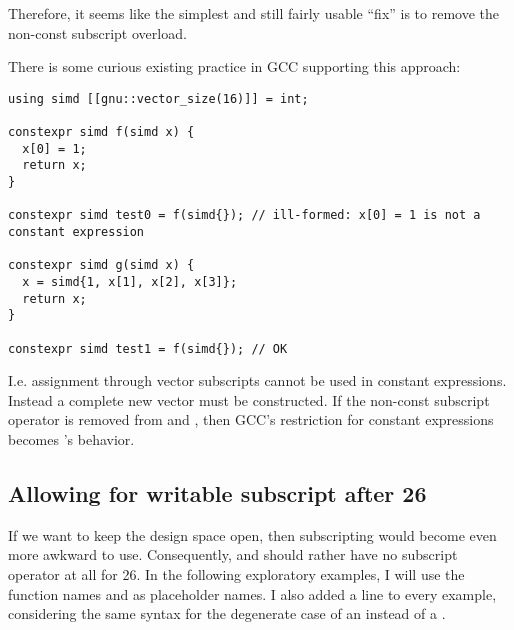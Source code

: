 Therefore, it seems like the simplest and still fairly usable “fix” is to
remove the non-const subscript overload.

There is some curious existing practice in GCC supporting this approach:
\medskip\begin{lstlisting}[style=Vc]
using simd [[gnu::vector_size(16)]] = int;

constexpr simd f(simd x) {
  x[0] = 1;
  return x;
}

constexpr simd test0 = f(simd{}); // ill-formed: x[0] = 1 is not a constant expression

constexpr simd g(simd x) {
  x = simd{1, x[1], x[2], x[3]};
  return x;
}

constexpr simd test1 = f(simd{}); // OK
\end{lstlisting}
I.e. assignment through vector subscripts cannot be used in constant expressions.
Instead a complete new vector must be constructed.
If the non-const subscript operator is removed from \simd and \mask, then GCC's
restriction for constant expressions becomes \std\simd's behavior.

\subsection{Allowing for writable subscript after \CC{}26}

If we want to keep the design space open, then subscripting would become even
more awkward to use.
Consequently, \simd and \mask should rather have no subscript operator at all
for \CC{}26.
In the following exploratory examples, I will use the function names 
and  as placeholder names.
I also added a line to every example, considering the same syntax for the
degenerate case of an  instead of a .

